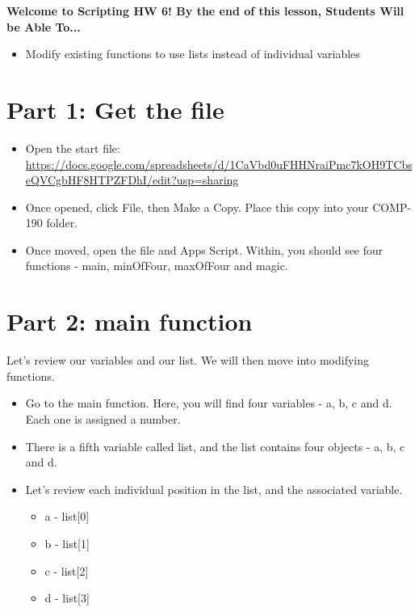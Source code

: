 \documentclass{article}
\newcommand{\AName}{Scripting HW 6}
\begin{document}
\textbf{Welcome to \AName!  By the end of this lesson, Students Will be Able To...}
\begin{itemize}
    \item Modify existing functions to use lists instead of individual variables
\end{itemize}


\section*{Part 1: Get the file}
\begin{itemize}
    \item Open the start file:  \url{https://docs.google.com/spreadsheets/d/1CaVbd0uFHHNraiPmc7kOH9TCbseQVCgbHF8HTPZFDhI/edit?usp=sharing}
    \item Once opened, click File, then Make a Copy.  Place this copy into your COMP-190 folder.
    \item Once moved, open the file and Apps Script.  Within, you should see four functions - main, minOfFour, maxOfFour and magic.
\end{itemize}

\section*{Part 2: main function}
Let's review our variables and our list.  We will then move into modifying functions.
\begin{itemize}
	\item Go to the main function.  Here, you will find four variables - a, b, c and d.  Each one is assigned a number.
	\item There is a fifth variable called list, and the list contains four objects - a, b, c and d.
	\item Let's review each individual position in the list, and the associated variable.
	\begin{itemize}
		\item a - list[0]
		\item b - list[1]
		\item c - list[2]
		\item d - list[3]
	\end{itemize}
\end{itemize}
\end{document}

